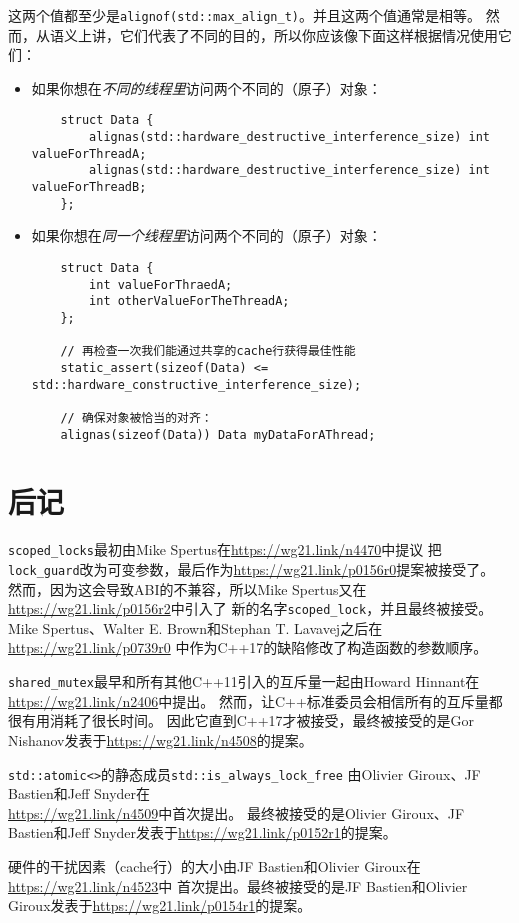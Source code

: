 这两个值都至少是\texttt{alignof(std::max\_align\_t)}。并且这两个值通常是相等。
然而，从语义上讲，它们代表了不同的目的，所以你应该像下面这样根据情况使用它们：
\begin{itemize}
    \item 如果你想在\emph{不同的线程里}访问两个不同的（原子）对象：
    \begin{lstlisting}
    struct Data {
        alignas(std::hardware_destructive_interference_size) int valueForThreadA;
        alignas(std::hardware_destructive_interference_size) int valueForThreadB;
    };
    \end{lstlisting}
    \item 如果你想在\emph{同一个线程里}访问两个不同的（原子）对象：
    \begin{lstlisting}
    struct Data {
        int valueForThraedA;
        int otherValueForTheThreadA;
    };

    // 再检查一次我们能通过共享的cache行获得最佳性能
    static_assert(sizeof(Data) <= std::hardware_constructive_interference_size);

    // 确保对象被恰当的对齐：
    alignas(sizeof(Data)) Data myDataForAThread;
    \end{lstlisting}
\end{itemize}

\section{后记}
\texttt{scoped\_locks}最初由Mike Spertus在\url{https://wg21.link/n4470}中提议
把\texttt{lock\_guard}改为可变参数，最后作为\url{https://wg21.link/p0156r0}提案被接受了。
然而，因为这会导致ABI的不兼容，所以Mike Spertus又在\url{https://wg21.link/p0156r2}中引入了
新的名字\texttt{scoped\_lock}，并且最终被接受。
Mike Spertus、Walter E. Brown和Stephan T. Lavavej之后在\url{https://wg21.link/p0739r0}
中作为C++17的缺陷修改了构造函数的参数顺序。

\texttt{shared\_mutex}最早和所有其他C++11引入的互斥量一起由Howard Hinnant在
\url{https://wg21.link/n2406}中提出。
然而，让C++标准委员会相信所有的互斥量都很有用消耗了很长时间。
因此它直到C++17才被接受，最终被接受的是Gor Nishanov发表于\url{https://wg21.link/n4508}的提案。

\texttt{std::atomic<>}的静态成员\texttt{std::is\_always\_lock\_free}
由Olivier Giroux、JF Bastien和Jeff Snyder在\\
\url{https://wg21.link/n4509}中首次提出。
最终被接受的是Olivier Giroux、JF Bastien和Jeff Snyder发表于\url{https://wg21.link/p0152r1}的提案。

硬件的干扰因素（cache行）的大小由JF Bastien和Olivier Giroux在\url{https://wg21.link/n4523}中
首次提出。最终被接受的是JF Bastien和Olivier Giroux发表于\url{https://wg21.link/p0154r1}的提案。
